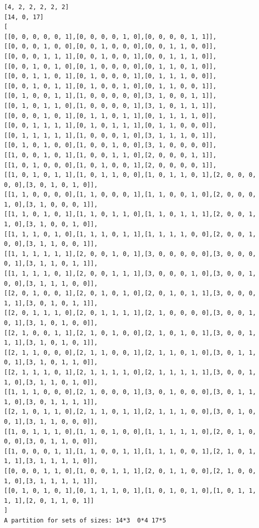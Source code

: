 \documentclass[final]{dmtcs-episciences}
\begin{document}
\begin{appendices}
\begin{verbatim} 
[4, 2, 2, 2, 2, 2]
[14, 0, 17]
[
[[0, 0, 0, 0, 0, 1],[0, 0, 0, 0, 1, 0],[0, 0, 0, 0, 1, 1]],
[[0, 0, 0, 1, 0, 0],[0, 0, 1, 0, 0, 0],[0, 0, 1, 1, 0, 0]],
[[0, 0, 0, 1, 1, 1],[0, 0, 1, 0, 0, 1],[0, 0, 1, 1, 1, 0]],
[[0, 0, 1, 0, 1, 0],[0, 1, 0, 0, 0, 0],[0, 1, 1, 0, 1, 0]],
[[0, 0, 1, 1, 0, 1],[0, 1, 0, 0, 0, 1],[0, 1, 1, 1, 0, 0]],
[[0, 0, 1, 0, 1, 1],[0, 1, 0, 0, 1, 0],[0, 1, 1, 0, 0, 1]],
[[0, 1, 0, 0, 1, 1],[1, 0, 0, 0, 0, 0],[3, 1, 0, 0, 1, 1]],
[[0, 1, 0, 1, 1, 0],[1, 0, 0, 0, 0, 1],[3, 1, 0, 1, 1, 1]],
[[0, 0, 0, 1, 0, 1],[0, 1, 1, 0, 1, 1],[0, 1, 1, 1, 1, 0]],
[[0, 0, 1, 1, 1, 1],[0, 1, 0, 1, 1, 1],[0, 1, 1, 0, 0, 0]],
[[0, 1, 1, 1, 1, 1],[1, 0, 0, 0, 1, 0],[3, 1, 1, 1, 0, 1]],
[[0, 1, 0, 1, 0, 0],[1, 0, 0, 1, 0, 0],[3, 1, 0, 0, 0, 0]],
[[1, 0, 0, 1, 0, 1],[1, 0, 0, 1, 1, 0],[2, 0, 0, 0, 1, 1]],
[[1, 0, 1, 0, 0, 0],[1, 0, 1, 0, 0, 1],[2, 0, 0, 0, 0, 1]],
[[1, 0, 1, 0, 1, 1],[1, 0, 1, 1, 0, 0],[1, 0, 1, 1, 0, 1],[2, 0, 0, 0, 0, 0],[3, 0, 1, 0, 1, 0]],
[[1, 1, 0, 0, 0, 0],[1, 1, 0, 0, 0, 1],[1, 1, 0, 0, 1, 0],[2, 0, 0, 0, 1, 0],[3, 1, 0, 0, 0, 1]],
[[1, 1, 0, 1, 0, 1],[1, 1, 0, 1, 1, 0],[1, 1, 0, 1, 1, 1],[2, 0, 0, 1, 1, 0],[3, 1, 0, 0, 1, 0]],
[[1, 1, 1, 0, 1, 0],[1, 1, 1, 0, 1, 1],[1, 1, 1, 1, 0, 0],[2, 0, 0, 1, 0, 0],[3, 1, 1, 0, 0, 1]],
[[1, 1, 1, 1, 1, 1],[2, 0, 0, 1, 0, 1],[3, 0, 0, 0, 0, 0],[3, 0, 0, 0, 0, 1],[3, 1, 1, 0, 1, 1]],
[[1, 1, 1, 1, 0, 1],[2, 0, 0, 1, 1, 1],[3, 0, 0, 0, 1, 0],[3, 0, 0, 1, 0, 0],[3, 1, 1, 1, 0, 0]],
[[2, 0, 1, 0, 0, 1],[2, 0, 1, 0, 1, 0],[2, 0, 1, 0, 1, 1],[3, 0, 0, 0, 1, 1],[3, 0, 1, 0, 1, 1]],
[[2, 0, 1, 1, 1, 0],[2, 0, 1, 1, 1, 1],[2, 1, 0, 0, 0, 0],[3, 0, 0, 1, 0, 1],[3, 1, 0, 1, 0, 0]],
[[2, 1, 0, 0, 1, 1],[2, 1, 0, 1, 0, 0],[2, 1, 0, 1, 0, 1],[3, 0, 0, 1, 1, 1],[3, 1, 0, 1, 0, 1]],
[[2, 1, 1, 0, 0, 0],[2, 1, 1, 0, 0, 1],[2, 1, 1, 0, 1, 0],[3, 0, 1, 1, 0, 1],[3, 1, 0, 1, 1, 0]],
[[2, 1, 1, 1, 0, 1],[2, 1, 1, 1, 1, 0],[2, 1, 1, 1, 1, 1],[3, 0, 0, 1, 1, 0],[3, 1, 1, 0, 1, 0]],
[[1, 1, 1, 0, 0, 0],[2, 1, 0, 0, 0, 1],[3, 0, 1, 0, 0, 0],[3, 0, 1, 1, 1, 0],[3, 0, 1, 1, 1, 1]],
[[2, 1, 0, 1, 1, 0],[2, 1, 1, 0, 1, 1],[2, 1, 1, 1, 0, 0],[3, 0, 1, 0, 0, 1],[3, 1, 1, 0, 0, 0]],
[[1, 0, 1, 1, 1, 0],[1, 1, 0, 1, 0, 0],[1, 1, 1, 1, 1, 0],[2, 0, 1, 0, 0, 0],[3, 0, 1, 1, 0, 0]],
[[1, 0, 0, 0, 1, 1],[1, 1, 0, 0, 1, 1],[1, 1, 1, 0, 0, 1],[2, 1, 0, 1, 1, 1],[3, 1, 1, 1, 1, 0]],
[[0, 0, 0, 1, 1, 0],[1, 0, 0, 1, 1, 1],[2, 0, 1, 1, 0, 0],[2, 1, 0, 0, 1, 0],[3, 1, 1, 1, 1, 1]],
[[0, 1, 0, 1, 0, 1],[0, 1, 1, 1, 0, 1],[1, 0, 1, 0, 1, 0],[1, 0, 1, 1, 1, 1],[2, 0, 1, 1, 0, 1]]
]
A partition for sets of sizes: 14*3  0*4 17*5
\end{verbatim}
\newpage


\end{appendices}
\end{document}
